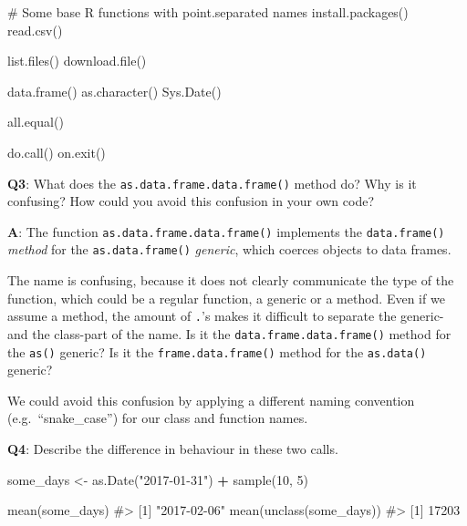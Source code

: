 \documentclass[
]{krantz}
\makeatletter
\newenvironment{Shaded}{\begin{snugshade}}{\end{snugshade}}
\newcommand{\CommentTok}[1]{\textcolor[rgb]{0.56,0.35,0.01}{\textit{#1}}}
\newcommand{\DecValTok}[1]{\textcolor[rgb]{0.00,0.00,0.81}{#1}}
\newcommand{\KeywordTok}[1]{\textcolor[rgb]{0.13,0.29,0.53}{\textbf{#1}}}
\newcommand{\NormalTok}[1]{#1}
\newcommand{\OperatorTok}[1]{\textcolor[rgb]{0.81,0.36,0.00}{\textbf{#1}}}
\newcommand{\StringTok}[1]{\textcolor[rgb]{0.31,0.60,0.02}{#1}}
\newenvironment{kframe}{%
\medskip{}
\setlength{\fboxsep}{.8em}
 \def\at@end@of@kframe{}%
 \ifinner\ifhmode%
  \def\at@end@of@kframe{\end{minipage}}%
  \begin{minipage}{\columnwidth}%
 \fi\fi%
 \def\FrameCommand##1{\hskip\@totalleftmargin \hskip-\fboxsep
 \colorbox{shadecolor}{##1}\hskip-\fboxsep
     \hskip-\linewidth \hskip-\@totalleftmargin \hskip\columnwidth}%
 \MakeFramed {\advance\hsize-\width
   \@totalleftmargin\z@ \linewidth\hsize
   \@setminipage}}%
 {\par\unskip\endMakeFramed%
 \at@end@of@kframe}
\renewenvironment{Shaded}{\begin{kframe}}{\end{kframe}}
\renewcommand{\KeywordTok} [1]{\textcolor[rgb]{0.00,0.44,0.13}{{#1}}}
\renewcommand{\DecValTok}  [1]{\textcolor[rgb]{0.25,0.63,0.44}{{#1}}}
\renewcommand{\StringTok}  [1]{\textcolor[rgb]{0.25,0.44,0.63}{{#1}}}
\renewcommand{\CommentTok} [1]{\textcolor[rgb]{0.38,0.63,0.69}{{#1}}}
\renewcommand{\NormalTok}  [1]{{#1}}
\makeatother
\begin{document}
\begin{Shaded}
\begin{Highlighting}[]
\CommentTok{# Some base R functions with point.separated names}
\KeywordTok{install.packages}\NormalTok{()}
\KeywordTok{read.csv}\NormalTok{()}

\KeywordTok{list.files}\NormalTok{()}
\KeywordTok{download.file}\NormalTok{()}

\KeywordTok{data.frame}\NormalTok{()}
\KeywordTok{as.character}\NormalTok{()}
\KeywordTok{Sys.Date}\NormalTok{()}

\KeywordTok{all.equal}\NormalTok{()}

\KeywordTok{do.call}\NormalTok{()}
\KeywordTok{on.exit}\NormalTok{()}
\end{Highlighting}
\end{Shaded}

\textbf{{Q3}}: What does the \texttt{as.data.frame.data.frame()} method do? Why is it confusing? How could you avoid this confusion in your own code?

\textbf{{A}}: The function \texttt{as.data.frame.data.frame()} implements the \texttt{data.frame()} \emph{method} for the \texttt{as.data.frame()} \emph{generic}, which coerces objects to data frames.

The name is confusing, because it does not clearly communicate the type of the function, which could be a regular function, a generic or a method. Even if we assume a method, the amount of \texttt{.}'s makes it difficult to separate the generic- and the class-part of the name. Is it the \texttt{data.frame.data.frame()} method for the \texttt{as()} generic? Is it the \texttt{frame.data.frame()} method for the \texttt{as.data()} generic?

We could avoid this confusion by applying a different naming convention (e.g.~``snake\_case'') for our class and function names.

\textbf{{Q4}}: Describe the difference in behaviour in these two calls.

\begin{Shaded}
\begin{Highlighting}[]
\NormalTok{some_days <-}\StringTok{ }\KeywordTok{as.Date}\NormalTok{(}\StringTok{"2017-01-31"}\NormalTok{) }\OperatorTok{+}\StringTok{ }\KeywordTok{sample}\NormalTok{(}\DecValTok{10}\NormalTok{, }\DecValTok{5}\NormalTok{)}

\KeywordTok{mean}\NormalTok{(some_days)}
\CommentTok{#> [1] "2017-02-06"}
\KeywordTok{mean}\NormalTok{(}\KeywordTok{unclass}\NormalTok{(some_days))}
\CommentTok{#> [1] 17203}
\end{Highlighting}
\end{Shaded}
\end{document}
